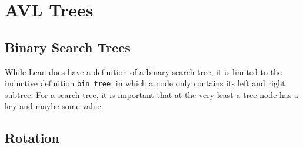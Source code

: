\section{AVL Trees}

\subsection{Binary Search Trees}
While Lean does have a definition of a binary search tree, it is limited to the inductive
definition \lstinline{bin_tree}, in which a node only contains its left and right subtree. For a search tree,
it is important that at the very least a tree node has a key and maybe some value. 



\subsection{Rotation}
